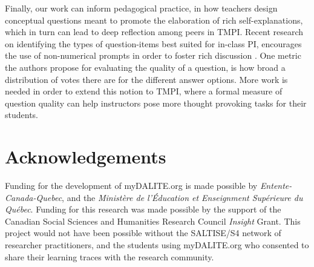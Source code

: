 \documentclass[notitlepage,12pt]{jedm}
\begin{document}
Finally, our work can inform pedagogical practice, in how teachers design 
conceptual questions meant to promote the elaboration of rich 
self-explanations, which in turn can lead to deep reflection among peers in 
TMPI.
Recent research on identifying the types of question-items best suited for 
in-class PI, encourages the use of non-numerical prompts in order to foster 
rich discussion \cite{cline_identifying_2021}. 
One metric the authors propose for evaluating the quality of a question, is how 
broad a distribution of votes there are for the different answer options.
More work is needed in order to extend this notion to TMPI, where a formal 
measure of question quality can help instructors pose more thought provoking 
tasks for their students.
 




\section{Acknowledgements}
Funding for the development of myDALITE.org is made possible by 
\textit{Entente-Canada-Quebec}, and the \textit{Ministère de l'Éducation et 
Enseignment Supérieure du Québec}. Funding for this research was made possible 
by the support of the Canadian Social Sciences and Humanities Research Council 
\textit{Insight} Grant. This project would not have been possible without the 
SALTISE/S4 network of researcher practitioners, and the students using 
myDALITE.org who consented to share their learning traces with the research 
community.

 




\end{document}
